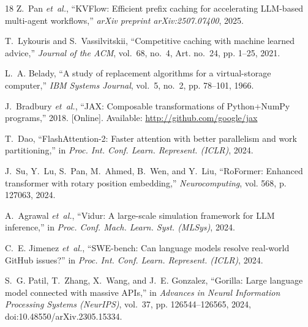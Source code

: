 \documentclass[conference,10pt]{IEEEtran}
\begin{document}
\begin{thebibliography}{18}
Z.~Pan \emph{et~al.}, ``{KVFlow}: Efficient prefix caching for accelerating {LLM}-based multi-agent workflows,'' \emph{arXiv preprint arXiv:2507.07400}, 2025.

T.~Lykouris and S.~Vassilvitskii, ``Competitive caching with machine learned advice,'' \emph{Journal of the ACM}, vol.~68, no.~4, Art. no.~24, pp. 1--25, 2021.

L.~A. Belady, ``A study of replacement algorithms for a virtual-storage computer,'' \emph{IBM Systems Journal}, vol.~5, no.~2, pp. 78--101, 1966.

J.~Bradbury \emph{et~al.}, ``{JAX}: Composable transformations of {Python+NumPy} programs,'' 2018. [Online]. Available: \url{http://github.com/google/jax}

T.~Dao, ``{FlashAttention-2}: Faster attention with better parallelism and work partitioning,'' in \emph{Proc. Int. Conf. Learn. Represent. (ICLR)}, 2024.

J.~Su, Y.~Lu, S.~Pan, M.~Ahmed, B.~Wen, and Y.~Liu, ``{RoFormer}: Enhanced transformer with rotary position embedding,'' \emph{Neurocomputing}, vol. 568, p. 127063, 2024.

A.~Agrawal \emph{et~al.}, ``{Vidur}: A large-scale simulation framework for {LLM} inference,'' in \emph{Proc. Conf. Mach. Learn. Syst. (MLSys)}, 2024.

C.~E. Jimenez \emph{et~al.}, ``{SWE-bench}: Can language models resolve real-world {GitHub} issues?'' in \emph{Proc. Int. Conf. Learn. Represent. (ICLR)}, 2024.

S.~G. Patil, T.~Zhang, X.~Wang, and J.~E. Gonzalez, ``{Gorilla}: Large language model connected with massive {APIs},'' in \emph{Advances in Neural Information Processing Systems (NeurIPS)}, vol.~37, pp. 126544--126565, 2024, doi:10.48550/arXiv.2305.15334.

\end{thebibliography}
\end{document}
